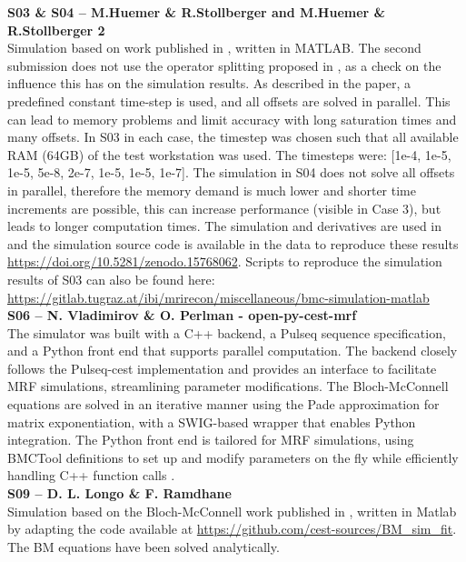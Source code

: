 \documentclass[11pt,a4paper]{article}
\begin{document}
\noindent\textbf{S03 \& S04 -- M.Huemer \& R.Stollberger and M.Huemer \& R.Stollberger 2}\\
Simulation based on work published in \cite{Graf2021}, written in MATLAB. The second submission does not use the operator splitting proposed in \cite{Graf2021}, as a check on the influence this has on the simulation results. As described in the paper, a predefined constant time-step is used, and all offsets are solved in parallel. This can lead to memory problems and limit accuracy with long saturation times and many offsets. In S03 in each case, the timestep was chosen such that all available RAM (64GB) of the test workstation was used. The timesteps were: [1e-4, 1e-5, 1e-5, 5e-8, 2e-7, 1e-5, 1e-5, 1e-7]. The simulation in S04 does not solve all offsets in parallel, therefore the memory demand is much lower and shorter time increments are possible, this can increase performance (visible in Case 3), but leads to longer computation times.
The simulation and derivatives are used in \cite{Stilianu2025}\cite{Huemer2025} and the simulation source code is available in the data to reproduce these results \url{https://doi.org/10.5281/zenodo.15768062}. Scripts to reproduce the simulation results of S03 can also be found here: \url{https://gitlab.tugraz.at/ibi/mrirecon/miscellaneous/bmc-simulation-matlab}\\

\noindent\textbf{S06 -- N. Vladimirov \& O. Perlman - open-py-cest-mrf}\\
The simulator was built with a C++ backend, a Pulseq sequence specification, and a Python front end that supports parallel computation. The backend closely follows the Pulseq-cest implementation and provides an interface to facilitate MRF simulations, streamlining parameter modifications. The Bloch-McConnell equations are solved in an iterative manner using the Pade approximation for matrix exponentiation, with a SWIG-based wrapper that enables Python integration. The Python front end is tailored for MRF simulations, using BMCTool definitions to set up and modify parameters on the fly while efficiently handling C++ function calls \cite{Vladimirov2025}.\\

\noindent\textbf{S09 -- D. L. Longo \& F. Ramdhane}\\
Simulation based on the Bloch-McConnell work published in \cite{Zaiss2018}, written in Matlab by adapting the code available at \url{https://github.com/cest-sources/BM_sim_fit}. The BM equations have been solved analytically.\\
\end{document}
